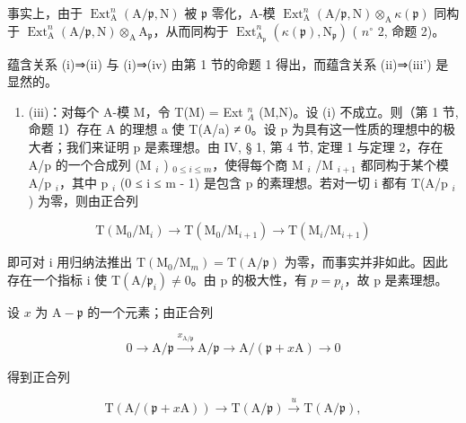 事实上，由于 \(\operatorname{Ext}_{\mathrm{A}}^{n}(\mathrm{A}/\mathfrak{p},\mathrm{N})\) 被 \(\mathfrak{p}\) 零化，A-模 \(\operatorname{Ext}_{\mathrm{A}}^{n}(\mathrm{A}/\mathfrak{p},\mathrm{N})\otimes_{\mathrm{A}}\kappa(\mathfrak{p})\) 同构于 \(\operatorname{Ext}_{\mathrm{A}}^{n}(\mathrm{A}/\mathfrak{p},\mathrm{N})\otimes_{\mathrm{A}}\mathrm{A}_{\mathfrak{p}}\)，从而同构于 \(\operatorname{Ext}_{\mathrm{A}_{\mathfrak{p}}}^{n}(\kappa(\mathfrak{p}),\mathrm{N}_{\mathfrak{p}})\) ( \(n^{\circ}\) 2, 命题 2)。

蕴含关系 (i)⇒(ii) 与 (i)⇒(iv) 由第 1 节的命题 1 得出，而蕴含关系 (ii)⇒(iii') 是显然的。

\begin{enumerate}
\def\labelenumi{(\roman{enumi})}
\setcounter{enumi}{2}
\tightlist
\item
  (iii)：对每个 A-模 M，令 T(M) = Ext \(_{A}^{n}\) (M,N)。设 (i) 不成立。则（第 1 节, 命题 1）存在 A 的理想 a 使 T(A/a) ≠ 0。设 p 为具有这一性质的理想中的极大者；我们来证明 p 是素理想。由 IV, § 1, 第 4 节, 定理 1 与定理 2，存在 A/p 的一个合成列 (M \(_{i}\) ) \(_{0\leqslant i\leqslant m}\)，使得每个商 M \(_{i}\) /M \(_{i+1}\) 都同构于某个模 A/p \(_{i}\)，其中 p \(_{i}\) (0 ≤ i ≤ m - 1) 是包含 p 的素理想。若对一切 i 都有 T(A/p \(_{i}\) ) 为零，则由正合列
\end{enumerate}

\[
\mathrm{T} \left(\mathrm{M} _ {0} / \mathrm{M} _ {i}\right) \longrightarrow \mathrm{T} \left(\mathrm{M} _ {0} / \mathrm{M} _ {i + 1}\right) \longrightarrow \mathrm{T} \left(\mathrm{M} _ {i} / \mathrm{M} _ {i + 1}\right)
\]

即可对 i 用归纳法推出 \(\mathrm{T}(\mathrm{M}_{0}/\mathrm{M}_{m})=\mathrm{T}(\mathrm{A}/\mathfrak{p})\) 为零，而事实并非如此。因此存在一个指标 i 使 \(\mathrm{T}(\mathrm{A}/\mathfrak{p}_{i})\neq0\)。由 p 的极大性，有 \(p=p_{i}\)，故 p 是素理想。

设 \(x\) 为 \(\mathrm{A} - \mathfrak{p}\) 的一个元素；由正合列

\[
0 \rightarrow \mathrm{A} / \mathfrak {p} \stackrel {{x _ {\mathrm{A} / \mathfrak {p}}}} {{\longrightarrow}} \mathrm{A} / \mathfrak {p} \longrightarrow \mathrm{A} / (\mathfrak {p} + x \mathrm{A}) \rightarrow 0
\]

得到正合列

\[
\mathrm{T} (\mathrm{A} / (\mathfrak {p} + x \mathrm{A})) \longrightarrow \mathrm{T} (\mathrm{A} / \mathfrak {p}) \stackrel {{u}} {{\longrightarrow}} \mathrm{T} (\mathrm{A} / \mathfrak {p}),
\]

